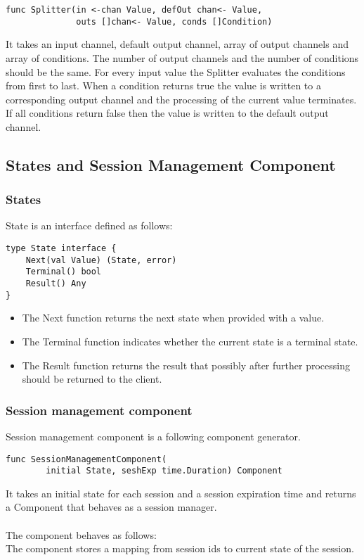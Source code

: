 \documentclass[12pt,a4paper]{article}
\begin{document}
\begin{lstlisting}
func Splitter(in <-chan Value, defOut chan<- Value, 
			  outs []chan<- Value, conds []Condition)
\end{lstlisting}
It takes an input channel, default output channel, array of output channels and array of conditions.
The number of output channels and the number of conditions should be the same.
For every input value the Splitter evaluates the conditions from first to last.
When a condition returns true the value is written to a corresponding output channel 
and the processing of the current value terminates. If all conditions return false
then the value is written to the default output channel.

\subsection{States and Session Management Component}
\subsubsection{States}
State is an interface defined as follows:

\begin{lstlisting}
type State interface {
    Next(val Value) (State, error)
    Terminal() bool
    Result() Any
}
\end{lstlisting}
\begin{itemize}
	\item The Next function returns the next state when provided with a value.
	\item The Terminal function indicates whether the current state is a terminal state.
	\item The Result function returns the result that possibly after further 
				processing should be returned to the client.
\end{itemize}

\subsubsection{Session management component}
Session management component is a following component generator.
\begin{lstlisting}
func SessionManagementComponent(
		initial State, seshExp time.Duration) Component
\end{lstlisting}
It takes an initial state for each session and a session expiration time and 
returns a Component that behaves as a session manager. 
\\
\\
The component behaves as follows:
\\
The component stores a mapping from session ids to current state of the session.
\end{document}
